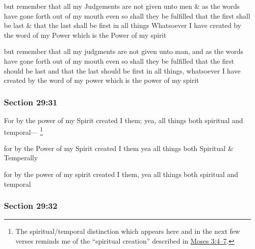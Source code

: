 		\begin{framed}
		\scriptsize
			\begin{compactdesc}
				\item[JSP] but remember that all my Judgements are not given unto men \& as the words have gone forth out of my mouth even so shall they be fulfilled that the first shall be last \& that the last shall be first in all things Whatsoever I have created by the word of my Power which is the Power of my spirit
				\item[HSN] but remember that all my judgments are not given unto man, and as the words have gone forth out of my mouth even so shall they be fulfilled that the first should be last and that the last should be first in all things, whatsoever I have created by the word of my power which is the power of my spirit
			\end{compactdesc}
		\end{framed}

	\subsubsection{Section 29:31} %
		\label{DC29-31}

		For by the power of my Spirit created I them; yea, all things both spiritual and temporal---%
			\footnote{%
				The spiritual/temporal distinction which appears here and in the next few verses reminds me of the ``spiritual creation'' described in \hyperref[MOSES-3-4]{Moses 3:4--7}.
				}

		\begin{framed}
		\scriptsize
			\begin{compactdesc}
				\item[JSP] for by the Power of my Spirit created I them yea all things both Spiritual \& Temperally
				\item[HSN] for by the power of my spirit created I them, yea all things both spiritual and temporal
			\end{compactdesc}
		\end{framed}

	\subsubsection{Section 29:32} %
		\label{DC29-32}

